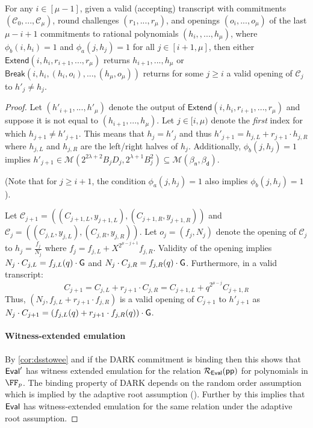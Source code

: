\begin{subclaim} 
 For any $i \in [\mu-1]$, given a valid (accepting) transcript with commitments $(\mathcal{C}_0,...,\mathcal{C}_\mu)$, round challenges $(r_1,...,r_\mu)$, and openings $(o_i,...,o_\mu)$ of the last $\mu-i + 1$ commitments to rational polynomials $(h_i,,...,h_\mu)$, where $\phi_b(i, h_i) = 1$ and $\phi_a(j, h_j) = 1$ for all $j \in [i+1,\mu]$, then either $\textsf{Extend}(i, h_i, r_{i+1},...,r_\mu)$ returns $h_{i+1},...,h_{\mu}$ or $\textsf{Break}(i, h_i, (h_i, o_i),...,(h_\mu, o_\mu))$ returns for some $j \geq i$ a valid opening of $\mathcal{C}_j$ to $h'_j \neq h_j$.  %
\end{subclaim} 
\begin{proof} 
Let $(h'_{i+1},...,h'_\mu)$ denote the output of $\textsf{Extend}(i, h_i, r_{i+1},...,r_\mu)$ and suppose it is not equal to $(h_{i+1},..., h_\mu)$. Let $j \in [i, \mu)$ denote the \emph{first} index for which $h_{j+1} \neq h'_{j+1}$. This means that $h_j = h'_j$ and thus $h'_{j+1} = h_{j, L} + r_{j+1} \cdot h_{j, R}$ where $h_{j, L}$ and $h_{j, R}$ are the left/right halves of $h_{j}$. Additionally, $\phi_b(j, h_{j}) = 1$ implies $h'_{j+1} \in \mathcal{M}(2^{2\lambda + 2} B_{j}D_j, 2^{\lambda + 1} B_{j}^2) \subseteq \mathcal{M}(\beta_\textsf{n}, \beta_\textsf{d})$. 

(Note that for $j \geq i+1$, the condition $\phi_a(j, h_j) = 1$ also implies $\phi_b(j, h_j) = 1$).

Let $\mathcal{C}_{j+1} = ((C_{j+1, L}, y_{j+1,L}), (C_{j+1,R}, y_{j+1,R}))$ and $\mathcal{C}_{j} = ((C_{j,L}, y_{j,L}), (C_{j,R},y_{j,R}))$. 
Let $o_j = (f_j, N_{j})$ denote the opening of $\mathcal{C}_{j}$ to $h_j =\frac{f_j}{N_{j}}$ where $f_{j} = f_{j, L} + X^{2^{\mu - j + 1}} f_{j, R}$. Validity of the opening implies $N_{j} \cdot C_{j,L} = f_{j,L}(q) \cdot \gr{G}$ and $N_{j} \cdot C_{j,R} = f_{j,R}(q) \cdot \gr{G}$. Furthermore, in a valid transcript: 
 $$C_{j+1}  = C_{j, L} + r_{j+1} \cdot C_{j,R} =  C_{j+1,L} + q^{2^{\mu - j}} C_{j+1,R}$$
  Thus, $(N_{j}, f_{j,L} + r_{j+1} \cdot f_{j, R})$ is a valid opening of $C_{j+1}$ to $h'_{j+1}$ as $N_{j} \cdot C_{j+1} = (f_{j, L}(q) + r_{j+1} \cdot f_{j, R}(q)) \cdot \gr{G}$. 
  
\paragraph{Witness-extended emulation}
By \cref{cor:dsstowee} and if the DARK commitment is binding then this shows that $\textsf{{Eval}}'$ has witness extended emulation for the relation $\mathcal{R}_{\textsf{{Eval}}}(\textsf{pp})$ for polynomials in $\FF_p$. The binding property of DARK depends on the random order assumption which is implied by the adaptive root assumption (). Further by  this implies that $\textsf{{Eval}}$ has witness-extended emulation for the same relation under the adaptive root assumption.

\end{proof} 


